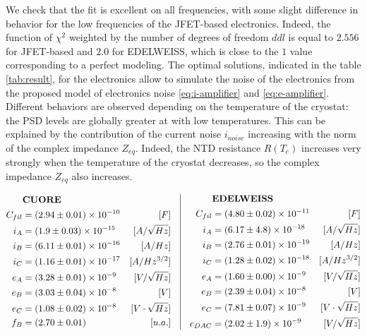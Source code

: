 We check that the fit is excellent on all frequencies, with some slight difference in behavior for the low frequencies of the JFET-based electronics. Indeed, the function of $\chi^2$ weighted by the number of degrees of freedom $ddl$ is equal to $2.556$ for JFET-based and $2.0$ for EDELWEISS, which is close to the $1$ value corresponding to a perfect modeling. The optimal solutions, indicated in the table \ref{tab:result}, for the electronics allow to simulate the noise of the electronics from the proposed model of electronics noise \ref{eq:i-amplifier} and \ref{eq:e-amplifier}. Different behaviors are observed depending on the temperature of the cryostat: the PSD levels are globally greater at with low temperatures. This can be explained by the contribution of the current noise $i_{noise}$ increasing with the norm of the complex impedance $Z_{eq}$. Indeed, the NTD resistance $R(T_e)$ increases very strongly when the temperature of the cryostat decreases, so the complex impedance $Z_{eq}$ also increases.

\begin{align}
\label{tab:result}
\begin{aligned}[c]
& \textrm{\textbf{CUORE}} \\
C_{fil} &= (2.94 \pm 0.01)\times 10^{-10}&[F] \\
i_A &= (1.9 \pm 0.03) \times 10^{-15}&[A/\sqrt{Hz}] \\
i_B &= (6.11 \pm 0.01) \times 10^{-16}&[A/Hz] \\
i_C &= (1.16 \pm 0.01) \times 10^{-17}&[A/Hz^{3/2}] \\
e_A &= (3.28 \pm 0.01) \times 10^{-9} &[V/\sqrt{Hz}] \\
e_B &= (3.03 \pm 0.04) \times 10^{-8}&[V] \\
e_C &= (1.08 \pm 0.02) \times 10^{-8} &[V \cdot \sqrt{Hz}] \\
f_B &= (2.70 \pm 0.01) & [u.a.]
\end{aligned}
\quad \vrule{} \quad
\begin{aligned}[c]
& \textrm{\textbf{EDELWEISS}} \\
C_{fil} &= (4.80 \pm 0.02)\times 10^{-11}&[F] \\
i_A &= (6.17 \pm 4.8) \times 10^{-18}&[A/\sqrt{Hz}] \\
i_B &= (2.76 \pm 0.01) \times 10^{-19}&[A/Hz] \\
i_C &= (1.28 \pm 0.02) \times 10^{-18}&[A/Hz^{3/2}] \\
e_A &= (1.60 \pm 0.00) \times 10^{-9} &[V/\sqrt{Hz}] \\
e_B &= (2.39 \pm 0.04) \times 10^{-8}&[V] \\
e_C &= (7.81 \pm 0.07) \times 10^{-9} &[V \cdot \sqrt{Hz}] \\
e_{DAC} &= (2.02 \pm 1.9) \times 10^{-9}&[V/\sqrt{Hz}] 
\end{aligned}
\end{align}


